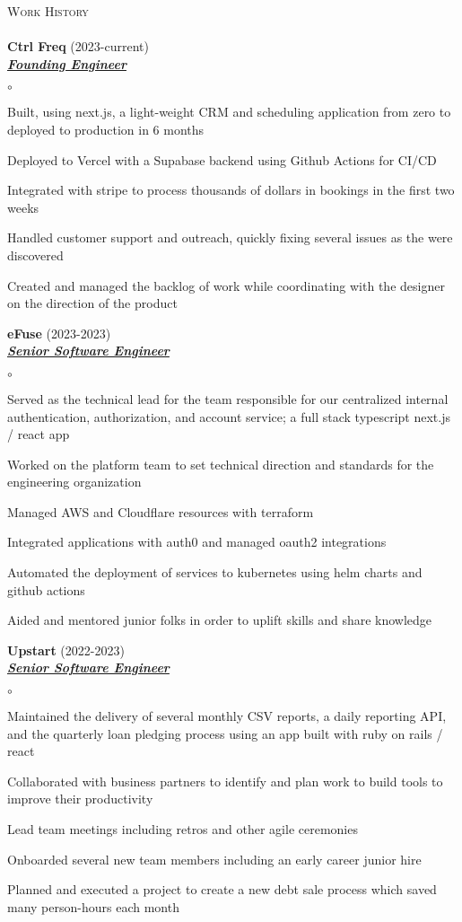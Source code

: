 \documentclass{article}
\newcommand{\lineunder}{\vspace*{-8pt} \\ \hspace*{-18pt} \hrulefill{} \\}
\newcommand{\header}[1]{{\hspace*{-15pt}\vspace*{6pt} \textsc{#1}} \vspace*{-6pt} \lineunder}
\newcommand{\employer}[3]{{ \textbf{#1} (#2)\\ \underline{\textbf{\emph{#3}}}\\  }}
\newenvironment{achievements}{\begin{list}{$\circ$}{\topsep 0pt \itemsep -2pt}}{\vspace*{4pt}\end{list}}
\begin{document}
\header{Work History}
\employer{Ctrl Freq}{2023-current}{Founding Engineer}
	\begin{achievements}
		\item Built, using next.js, a light-weight CRM and scheduling application from
		      zero to deployed to production in 6 months
		\item Deployed to Vercel with a Supabase backend using Github Actions for CI/CD
		\item Integrated with stripe to process thousands of dollars in bookings in the first two weeks
		\item Handled customer support and outreach, quickly fixing several issues as the were discovered
		\item Created and managed the backlog of work while coordinating with the designer on the
		      direction of the product
	\end{achievements}
\employer{eFuse}{2023-2023}{Senior Software Engineer}
	\begin{achievements}
	\item Served as the technical lead for the team responsible for our centralized internal authentication, authorization, and account service; a full stack typescript next.js / react app
	\item Worked on the platform team to set technical direction and standards for the engineering organization
	\item Managed AWS and Cloudflare resources with terraform
	\item Integrated applications with auth0 and managed oauth2 integrations
	\item Automated the deployment of services to kubernetes using helm charts and github actions
	\item Aided and mentored junior folks in order to uplift skills and share knowledge
	\end{achievements}
\employer{Upstart}{2022-2023}{Senior Software Engineer}
	\begin{achievements}
	\item Maintained the delivery of several monthly CSV reports, a daily reporting API, and the quarterly loan pledging process using an app built with ruby on rails / react
	\item Collaborated with business partners to identify and plan work to build tools to improve their productivity
	\item Lead team meetings including retros and other agile ceremonies
	\item Onboarded several new team members including an early career junior hire
	\item Planned and executed a project to create a new debt sale process which saved many person-hours each month
	\end{achievements}
\end{document}
